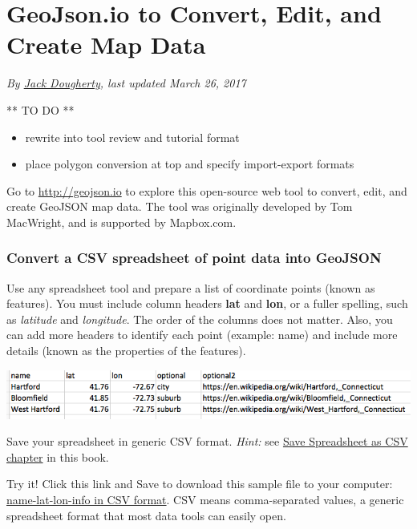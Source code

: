 \documentclass[
  english,
]{book}
\providecommand{\tightlist}{%
  \setlength{\itemsep}{0pt}\setlength{\parskip}{0pt}}
\begin{document}
\hypertarget{geojsonio}{%
\section{GeoJson.io to Convert, Edit, and Create Map Data}\label{geojsonio}}

\emph{By \href{authors}{Jack Dougherty}, last updated March 26, 2017}

** TO DO **

\begin{itemize}
\tightlist
\item
  rewrite into tool review and tutorial format
\item
  place polygon conversion at top and specify import-export formats
\end{itemize}

Go to \url{http://geojson.io} to explore this open-source web tool to convert, edit, and create GeoJSON map data. The tool was originally developed by Tom MacWright, and is supported by Mapbox.com.

\hypertarget{convert-a-csv-spreadsheet-of-point-data-into-geojson}{%
\subsubsection*{Convert a CSV spreadsheet of point data into GeoJSON}\label{convert-a-csv-spreadsheet-of-point-data-into-geojson}}

Use any spreadsheet tool and prepare a list of coordinate points (known as features). You must include column headers \textbf{lat} and \textbf{lon}, or a fuller spelling, such as \emph{latitude} and \emph{longitude}. The order of the columns does not matter. Also, you can add more headers to identify each point (example: name) and include more details (known as the properties of the features).

\includegraphics{images/09-transform/name-lat-lon-info.png}

Save your spreadsheet in generic CSV format. \emph{Hint:} see \href{csv}{Save Spreadsheet as CSV chapter} in this book.

Try it! Click this link and Save to download this sample file to your computer: \href{data/name-lat-lon-info.csv}{name-lat-lon-info in CSV format}. CSV means comma-separated values, a generic spreadsheet format that most data tools can easily open.
\end{document}

